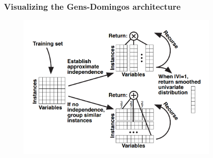 \documentclass{beamer}
\begin{document}
\begin{frame}
  \frametitle{Visualizing the Gens-Domingos architecture}

  \begin{figure}[h]
    \centering\includegraphics[width=0.9\textwidth]{imgs/learnspn.png}
    \captionsetup{justification=centering}
    \caption*{\cite{gens-domingos}}
  \end{figure}
\end{frame}
\end{document}
